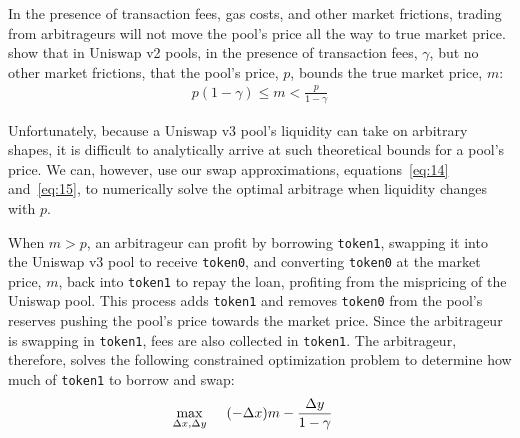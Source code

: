 \documentclass[11pt]{article}
\begin{document}
In the presence of transaction fees, gas costs, and other market frictions, trading from arbitrageurs will not move the pool's price all the way to true market price. \citet{angeris2021analysis} show that in Uniswap v2 pools, in the presence of transaction fees, $\gamma$, but no other market frictions, that the pool's price, $p$, bounds the true market price, $m$:
\begin{gather*}
    p (1 - \gamma) \le m < \frac{p}{1 - \gamma}
\end{gather*}

Unfortunately, because a Uniswap v3 pool's liquidity can take on arbitrary shapes, it is difficult to analytically arrive at such theoretical bounds for a pool's price. We can, however, use our swap approximations, equations~\eqref{eq:14} and~\eqref{eq:15}, to numerically solve the optimal arbitrage when liquidity changes with $p$.

When $m > p$, an arbitrageur can profit by borrowing \texttt{token1}, swapping it into the Uniswap v3 pool to receive \texttt{token0}, and converting \texttt{token0} at the market price, $m$, back into \texttt{token1} to repay the loan, profiting from the mispricing of the Uniswap pool. This process adds \texttt{token1} and removes \texttt{token0} from the pool's reserves pushing the pool's price towards the market price. Since the arbitrageur is swapping in \texttt{token1}, fees are also collected in \texttt{token1}. The arbitrageur, therefore, solves the following constrained optimization problem to determine how much of \texttt{token1} to borrow and swap:
\begin{align*}
    \max_{\Delta x, \Delta y} \hspace{0.5cm} &(-\Delta x) m - \frac{\Delta y}{1 - \gamma}
\end{align*}
\end{document}
